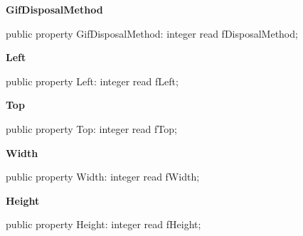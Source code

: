 \documentclass{report}
\newif\ifpdf
\begin{document}
\begin{list}{}
\begin{flushleft}
\ifpdf
\end{flushleft}
\fi


\par  \label{gifanimator.TGifThread-GifDisposalMethod}
\item[\textbf{GifDisposalMethod}\hfill]
\ifpdf
\begin{flushleft}
\fi
\begin{ttfamily}
public property GifDisposalMethod: integer read fDisposalMethod;\end{ttfamily}

\ifpdf
\end{flushleft}
\fi


\par  \label{gifanimator.TGifThread-Left}
\item[\textbf{Left}\hfill]
\ifpdf
\begin{flushleft}
\fi
\begin{ttfamily}
public property Left: integer read fLeft;\end{ttfamily}

\ifpdf
\end{flushleft}
\fi


\par  \label{gifanimator.TGifThread-Top}
\item[\textbf{Top}\hfill]
\ifpdf
\begin{flushleft}
\fi
\begin{ttfamily}
public property Top: integer read fTop;\end{ttfamily}

\ifpdf
\end{flushleft}
\fi


\par  \label{gifanimator.TGifThread-Width}
\item[\textbf{Width}\hfill]
\ifpdf
\begin{flushleft}
\fi
\begin{ttfamily}
public property Width: integer read fWidth;\end{ttfamily}

\ifpdf
\end{flushleft}
\fi


\par  \label{gifanimator.TGifThread-Height}
\item[\textbf{Height}\hfill]
\ifpdf
\begin{flushleft}
\fi
\begin{ttfamily}
public property Height: integer read fHeight;\end{ttfamily}

\ifpdf
\end{flushleft}
\fi


\par  \end{list}
\end{document}
